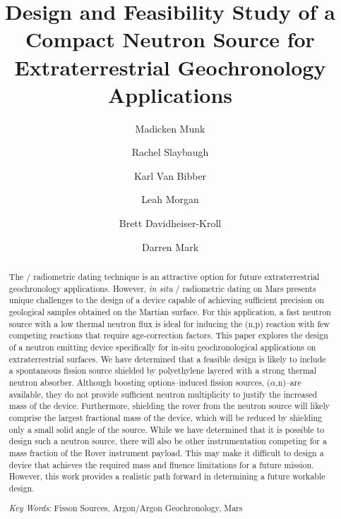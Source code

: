 \documentclass{mc2015}
\begin{document}
\title{Design and Feasibility Study of a Compact Neutron Source for Extraterrestrial Geochronology Applications}

\author{Madicken Munk}
\author{Rachel Slaybaugh}
\author{Karl Van Bibber}

\author{Leah Morgan}
\author{Brett Davidheiser-Kroll}
\author{Darren Mark}

\maketitle

\begin{abstract}
The / radiometric dating technique is an attractive option for future extraterrestrial geochronology applications. However, \textit{in situ} / radiometric dating on Mars presents unique challenges to the design of a device capable of achieving sufficient precision on geological samples obtained on the Martian surface. For this application, a fast neutron source with a low thermal neutron flux is ideal for inducing the (n,p) reaction with few competing reactions that require age-correction factors. This paper explores the design of a neutron emitting device specifically for in-situ geochronological applications on extraterrestrial surfaces. We have determined that a feasible design is likely to include a  spontaneous fission source shielded by polyethylene layered with a strong thermal neutron absorber. Although boosting options--induced fission sources, ($\alpha$,n)--are available, they do not provide sufficient neutron multiplicity to justify the increased mass of the device. Furthermore, shielding the rover from the neutron source will likely comprise the largest fractional mass of the device, which will be reduced by shielding only a small solid angle of the source. While we have determined that it is possible to design such a neutron source, there will also be other instrumentation competing for a mass fraction of the Rover instrument payload. This may make it difficult to design a device that achieves the required mass and fluence limitations for a future mission. However, this work provides a realistic path forward in determining a future workable design. 

\emph{Key Words}: Fisson Sources, Argon/Argon Geochronology, Mars
\end{abstract}
\end{document}

